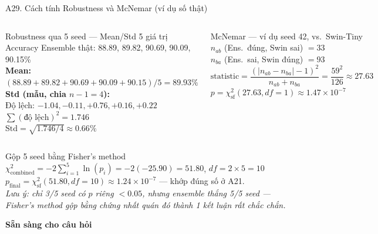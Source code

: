 \documentclass[10pt, aspectratio=169]{beamer}
\begin{document}
\begin{frame}{A29. Cách tính Robustness và McNemar (ví dụ số thật)}
    \scriptsize
    \begin{columns}[T]
        \begin{block}{Robustness qua 5 seed --- Mean/Std}
            \scriptsize
            5 giá trị Accuracy Ensemble thật: 88.89, 89.82, 90.69, 90.09, 90.15\%\\[3pt]
            \textbf{Mean:} $(88.89{+}89.82{+}90.69{+}90.09{+}90.15)/5 = 89.93\%$\\[3pt]
            \textbf{Std (mẫu, chia $n{-}1{=}4$):}\\
            Độ lệch: $-1.04, -0.11, +0.76, +0.16, +0.22$\\
            $\sum (\text{độ lệch})^2 = 1.746$\\
            $\mathrm{Std} = \sqrt{1.746/4} \approx 0.66\%$
        \end{block}

        \begin{block}{McNemar --- ví dụ seed 42, vs.\ Swin-Tiny}
            \scriptsize
            $n_{ab}$ (Ens.\ đúng, Swin sai) $=33$\\
            $n_{ba}$ (Ens.\ sai, Swin đúng) $=93$\\[3pt]
            $\text{statistic} = \dfrac{(|n_{ab}-n_{ba}|-1)^2}{n_{ab}+n_{ba}} = \dfrac{59^2}{126} \approx 27.63$\\[3pt]
            $p = \chi^2_{\text{sf}}(27.63, df{=}1) \approx 1.47{\times}10^{-7}$
        \end{block}
    \end{columns}

    \vspace{0.2cm}
    \begin{block}{Gộp 5 seed bằng Fisher's method}
        \scriptsize
        $\chi^2_{\text{combined}} = -2\sum_{i=1}^{5}\ln(p_i) = -2(-25.90) = 51.80$, $df=2{\times}5=10$\\
        $p_{\text{final}} = \chi^2_{\text{sf}}(51.80, df{=}10) \approx 1.24{\times}10^{-7}$ --- khớp đúng số ở A21.\\
        \textit{Lưu ý: chỉ 3/5 seed có $p$ riêng $<0.05$, nhưng ensemble thắng 5/5 seed --- Fisher's method gộp bằng chứng nhất quán đó thành 1 kết luận rất chắc chắn.}
    \end{block}
\end{frame}

\begin{frame}[plain]
    \centering
    \vspace{2cm}
    {\Huge \textbf{\textcolor{usthblue}{Sẵn sàng cho câu hỏi}}}\\[1cm]
    \\[1cm]
\end{frame}
\end{document}
